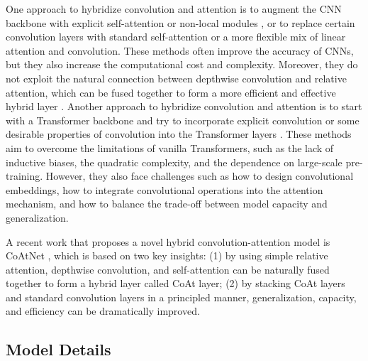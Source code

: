 \documentclass{article} \usepackage{iclr2023_conference,times}
\begin{document}
One approach to hybridize convolution and attention is to augment the CNN backbone with explicit self-attention or non-local modules \citep{Wang_2018_CVPR}, or to replace certain convolution layers with standard self-attention \citep{Bello_2019_ICCV} or a more flexible mix of linear attention and convolution. These methods often improve the accuracy of CNNs, but they also increase the computational cost and complexity. Moreover, they do not exploit the natural connection between depthwise convolution and relative attention, which can be fused together to form a more efficient and effective hybrid layer \citep{dai2021coatnet}. Another approach to hybridize convolution and attention is to start with a Transformer backbone and try to incorporate explicit convolution or some desirable properties of convolution into the Transformer layers \citep{Liu_2021_ICCV}. These methods aim to overcome the limitations of vanilla Transformers, such as the lack of inductive biases, the quadratic complexity, and the dependence on large-scale pre-training. However, they also face challenges such as how to design convolutional embeddings, how to integrate convolutional operations into the attention mechanism, and how to balance the trade-off between model capacity and generalization.

A recent work that proposes a novel hybrid convolution-attention model is CoAtNet \citep{dai2021coatnet}, which is based on two key insights: (1) by using simple relative attention, depthwise convolution, and self-attention can be naturally fused together to form a hybrid layer called CoAt layer; (2) by stacking CoAt layers and standard convolution layers in a principled manner, generalization, capacity, and efficiency can be dramatically improved.

\subsection{Model Details}
\label{proofs}
\end{document}
